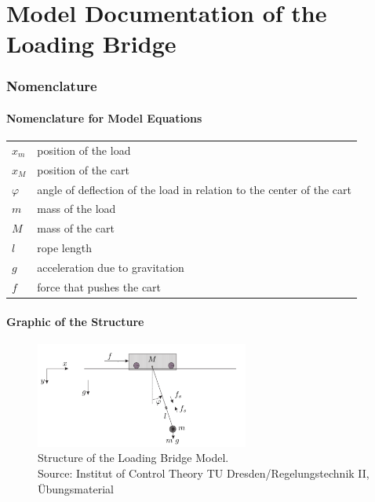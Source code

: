 \documentclass[10pt,a4paper]{article}
\begin{document}
	\part*{Model Documentation of the \\ Loading Bridge} %


	\section{Nomenclature} %
	\subsection{Nomenclature for Model Equations} %

	\begin{tabular}{ll}
		$x_m$ & position of the load \\
		$x_M$ & position of the cart \\
		$\varphi$ & angle of deflection of the load in relation to the center of the cart\\
		$m$ & mass of the load \\
		$M$ & mass of the cart \\
		$l$ & rope length \\
		$g$ & acceleration due to gravitation \\
		$f$ & force that pushes the cart \\

	\end{tabular}

	\subsection{Graphic of the Structure}
	\begin{figure}[H]
		\centering
		\captionsetup{justification=centering, margin=1cm}
		\includegraphics[width=70mm]{loading_bridge.pdf}
		\caption{Structure of the Loading Bridge Model. \\ \footnotesize{Source: Institut of Control Theory TU Dresden/Regelungstechnik II, Übungsmaterial}}
	\end{figure}
\end{document}
